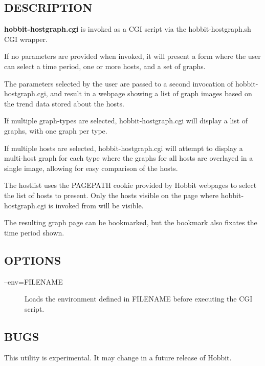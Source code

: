 \subsection{DESCRIPTION}
\textbf{hobbit-hostgraph.cgi} is invoked as a CGI script via the hobbit-hostgraph.sh CGI wrapper. 

  If no parameters are provided when invoked, it will present a form
  where the user can select a time period, one or more hosts, and a
  set of graphs. 



  The parameters selected by the user are passed to a second
  invocation of hobbit-hostgraph.cgi, and result in a webpage showing
  a list of graph images based on the trend data stored about the
  hosts. 



  If multiple graph-types are selected, hobbit-hostgraph.cgi will display a list of graphs, with one graph per type. 


  If multiple hosts are selected, hobbit-hostgraph.cgi will attempt to
  display a multi-host graph for each type where the graphs for all
  hosts are overlayed in a single image, allowing for easy comparison
  of the hosts. 



  The hostlist uses the PAGEPATH cookie provided by Hobbit webpages to
  select the list of hosts to present. Only the hosts visible on the
  page where hobbit-hostgraph.cgi is invoked from will be visible. 



  The resulting graph page can be bookmarked, but the bookmark also fixates the time period shown. 


 
\subsection{OPTIONS}
\begin{description}
\item[--env=FILENAME] Loads the environment defined in FILENAME before executing the CGI script. 

 


\end{description}
\subsection{BUGS}
 This utility is experimental. It may change in a future release of Hobbit. 

